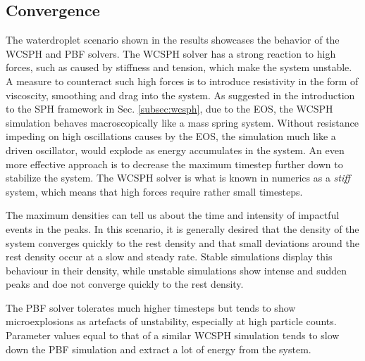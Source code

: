 \documentclass[11pt, letterpaper, twocolumn]{article}
\begin{document}
\subsection{Convergence}
\label{disc:convergence}

The waterdroplet scenario shown in the results showcases the behavior of the WCSPH and PBF solvers. The WCSPH solver has a strong reaction to high forces, such as caused by stiffness and tension, which make the system unstable. A measure to counteract such high forces is to introduce resistivity in the form of viscoscity, smoothing and drag into the system. As suggested in the introduction to the SPH framework in Sec. \ref{subsec:wcsph}, due to the EOS, the WCSPH simulation behaves macroscopically like a mass spring system. Without resistance impeding on high oscillations causes by the EOS, the simulation much like a driven oscillator, would explode as energy accumulates in the system.
An even more effective approach is to decrease the maximum timestep further down to stabilize the system. The WCSPH solver is what is known in numerics as a \textit{stiff} system, which means that high forces require rather small timesteps.

The maximum densities can tell us about the time and intensity of impactful events in the peaks. In this scenario, it is generally desired that the density of the system converges quickly to the rest density and that small deviations around the rest density occur at a slow and steady rate. Stable simulations display this behaviour in their density, while unstable simulations show intense and sudden peaks and doe not converge quickly to the rest density.

The PBF solver tolerates much higher timesteps but tends to show microexplosions as artefacts of unstability, especially at high particle counts. Parameter values equal to that of a similar WCSPH simulation tends to slow down the PBF simulation and extract a lot of energy from the system.
\end{document}
